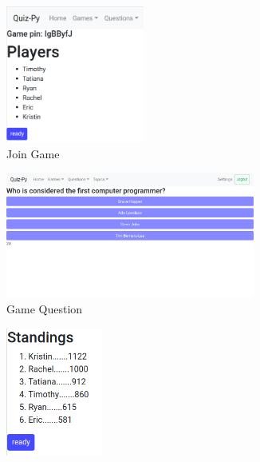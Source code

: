 \documentclass{article}
\begin{document}
            \begin{figure}[H]
                \centering
                \begin{subfigure}[b]{0.49\textwidth}
                    \centering
                    \includegraphics[width=0.5\textwidth]{images/frontend-join_game.png}
                    \caption{Join Game}
                    \label{fig:frontend-join_game}
                \end{subfigure}
                \begin{subfigure}[b]{0.49\textwidth}
                    \centering
                    \includegraphics[width=0.9\textwidth]{images/frontend-question.png}
                    \caption{Game Question}
                    \label{fig:frontend-question}
                \end{subfigure}
                \begin{subfigure}[b]{0.49\textwidth}
                    \centering
                    \vspace{3mm}
                    \includegraphics[width=0.35\textwidth]{images/frontend-standings.png}

\end{subfigure}
\end{figure}
\end{document}
